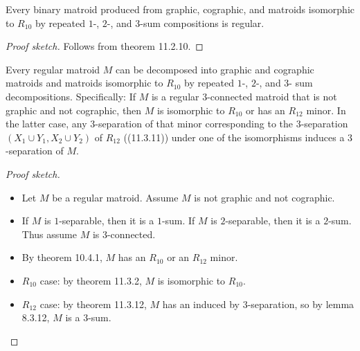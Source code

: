 \begin{theorem}
  \label{thm:11.3.14.seymour_easy}
  Every binary matroid produced from graphic, cographic, and matroids isomorphic to $R_{10}$ by repeated $1$-, $2$-, and $3$-sum compositions is regular.
\end{theorem}

\begin{proof}[Proof sketch]
  Follows from theorem 11.2.10.
\end{proof}

\begin{theorem}
  \label{thm:11.3.14.seymour_hard}
  Every regular matroid $M$ can be decomposed into graphic and cographic matroids and matroids isomorphic to $R_{10}$ by repeated $1$-, $2$-, and $3$- sum decompositions.
  Specifically: If $M$ is a regular $3$-connected matroid that is not graphic and not cographic, then $M$ is isomorphic to $R_{10}$ or has an $R_{12}$ minor. In the latter case, any $3$-separation of that minor corresponding to the 3-separation $(X_{1} \cup Y_{1}, X_{2} \cup Y_{2})$ of $R_{12}$ ((11.3.11)) under one of the isomorphisms induces a $3$-separation of $M$.
\end{theorem}

\begin{proof}[Proof sketch]
  \begin{itemize}
    \item Let $M$ be a regular matroid. Assume $M$ is not graphic and not cographic.
    \item If $M$ is $1$-separable, then it is a $1$-sum. If $M$ is $2$-separable, then it is a $2$-sum. Thus assume $M$ is $3$-connected.
    \item By theorem 10.4.1, $M$ has an $R_{10}$ or an $R_{12}$ minor.
    \item $R_{10}$ case: by theorem 11.3.2, $M$ is isomorphic to $R_{10}$.
    \item $R_{12}$ case: by theorem 11.3.12, $M$ has an induced by $3$-separation, so by lemma 8.3.12, $M$ is a $3$-sum.
  \end{itemize}
\end{proof}


